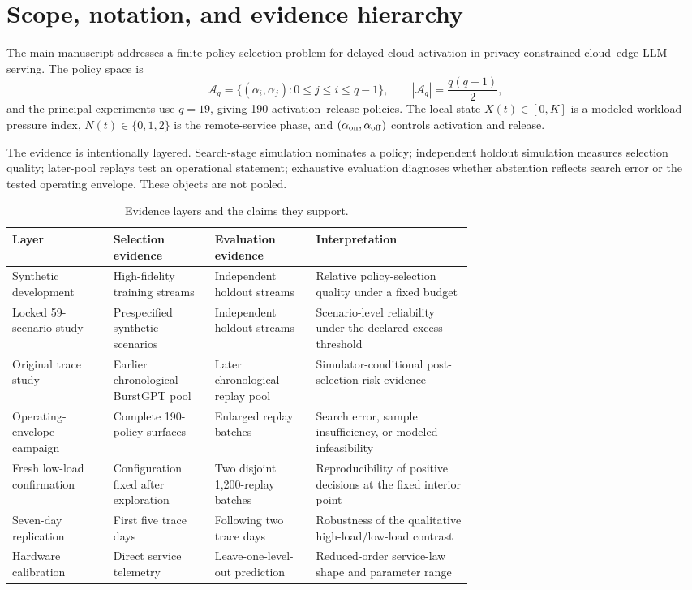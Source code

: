 \documentclass[futureinternet,supfile,submit,moreauthors]{Definitions/mdpi}
\newcommand{\Aset}{\mathcal A}
\begin{document}
\section{Scope, notation, and evidence hierarchy}
\label{sec:scope}

The main manuscript addresses a finite policy-selection problem for delayed
cloud activation in privacy-constrained cloud--edge LLM serving. The policy
space is
\[
\Aset_q
=
\{(\alpha_i,\alpha_j):0\leq j\leq i\leq q-1\},
\qquad
|\Aset_q|=\frac{q(q+1)}{2},
\]
and the principal experiments use \(q=19\), giving 190 activation--release
policies. The local state \(X(t)\in[0,K]\) is a modeled workload-pressure
index, \(N(t)\in\{0,1,2\}\) is the remote-service phase, and
\((\alpha_{\rm on},\alpha_{\rm off})\) controls activation and release.

The evidence is intentionally layered. Search-stage simulation nominates a
policy; independent holdout simulation measures selection quality; later-pool
replays test an operational statement; exhaustive evaluation diagnoses whether
abstention reflects search error or the tested operating envelope. These
objects are not pooled.

\begin{table}[h]
\centering
\small
\caption{Evidence layers and the claims they support.}
\label{tab:evidence-layers}
\begin{tabularx}{\linewidth}{>{\raggedright\arraybackslash}p{0.22\linewidth}
>{\raggedright\arraybackslash}p{0.22\linewidth}
>{\raggedright\arraybackslash}p{0.22\linewidth}
>{\raggedright\arraybackslash}X}
\toprule
Layer & Selection evidence & Evaluation evidence & Interpretation\\
\midrule
Synthetic development & High-fidelity training streams & Independent holdout streams & Relative policy-selection quality under a fixed budget\\
Locked 59-scenario study & Prespecified synthetic scenarios & Independent holdout streams & Scenario-level reliability under the declared excess threshold\\
Original trace study & Earlier chronological BurstGPT pool & Later chronological replay pool & Simulator-conditional post-selection risk evidence\\
Operating-envelope campaign & Complete 190-policy surfaces & Enlarged replay batches & Search error, sample insufficiency, or modeled infeasibility\\
Fresh low-load confirmation & Configuration fixed after exploration & Two disjoint 1,200-replay batches & Reproducibility of positive decisions at the fixed interior point\\
Seven-day replication & First five trace days & Following two trace days & Robustness of the qualitative high-load/low-load contrast\\
Hardware calibration & Direct service telemetry & Leave-one-level-out prediction & Reduced-order service-law shape and parameter range\\
\bottomrule
\end{tabularx}
\end{table}
\end{document}
